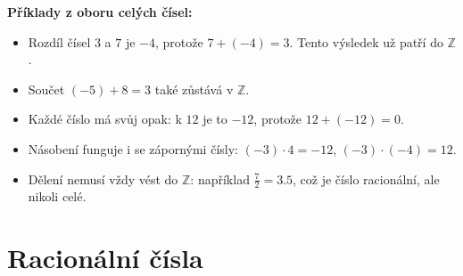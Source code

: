 \documentclass[12pt,a4paper]{article}
\begin{document}
\begin{examplebox}
\textbf{Příklady z oboru celých čísel:}

\begin{itemize}
    \item Rozdíl čísel $3$ a $7$ je $-4$, protože $7+(-4)=3$. Tento výsledek už patří do $\mathbb{Z}$.  
    \item Součet $(-5)+8=3$ také zůstává v $\mathbb{Z}$.  
    \item Každé číslo má svůj opak: k $12$ je to $-12$, protože $12+(-12)=0$.  
    \item Násobení funguje i se zápornými čísly: $(-3)\cdot 4 = -12$, $(-3)\cdot(-4)=12$.  
    \item Dělení nemusí vždy vést do $\mathbb{Z}$: například $\tfrac{7}{2}=3.5$, což je číslo racionální, ale nikoli celé.  
\end{itemize}
\end{examplebox}


\newpage

\section{Racionální čísla}
\end{document}
